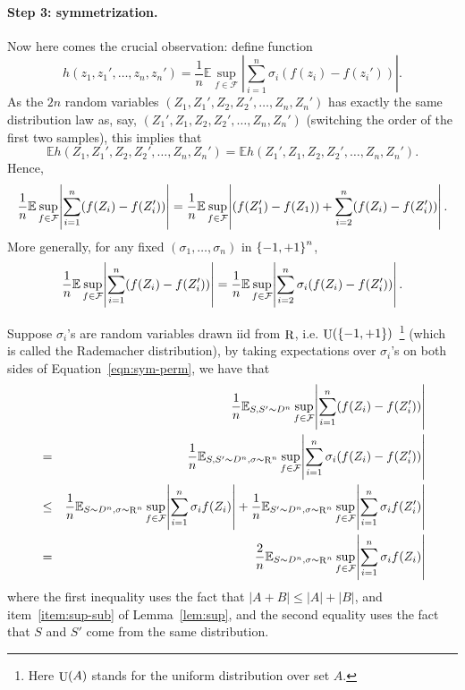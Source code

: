 \documentclass{article}
\DeclareMathOperator*{\R}{{\rm R}}
\DeclareMathOperator*{\U}{{\rm U}}
\newcommand{\EE}{\mathbb{E}}
\newcommand{\Fcal}{\mathcal{F}}
\begin{document}
\paragraph{Step 3: symmetrization.} Now here comes the crucial observation: define function
\[ h(z_1, z_1',\ldots,z_n,z_n') = \frac{1}{n} \EE \sup_{f \in \Fcal} |\sum_{i=1}^n \sigma_i (f(z_i) - f(z_i'))|. \]
As the $2n$ random variables
$(Z_1,Z_1',Z_2,Z_2',\ldots,Z_n,Z_n')$ has exactly the same distribution law as, say, $(Z_1',Z_1,Z_2,Z_2',\ldots,Z_n,Z_n')$ (switching the order of the first two samples), this implies that
\[ \EE h(Z_1,Z_1',Z_2,Z_2',\ldots,Z_n,Z_n') = \EE h(Z_1',Z_1,Z_2,Z_2',\ldots,Z_n,Z_n'). \]
Hence,
\[
  \frac{1}{n} \EE \sup_{f \in \Fcal} \abs{\sum_{i=1}^n (f(Z_i) - f(Z_i'))}
   = \frac{1}{n} \EE \sup_{f \in \Fcal} \abs{(f(Z_1') - f(Z_1)) + \sum_{i=2}^n (f(Z_i) - f(Z_i'))}.
\]
More generally, for any fixed $(\sigma_1, \ldots, \sigma_n)$ in $\cbr{-1,+1}^n$,
\begin{equation}
  \frac{1}{n} \EE \sup_{f \in \Fcal} \abs{\sum_{i=1}^n (f(Z_i) - f(Z_i'))}
  = \frac{1}{n} \EE \sup_{f \in \Fcal} \abs{\sum_{i=2}^n \sigma_i (f(Z_i) - f(Z_i'))}.
  \label{eqn:sym-perm}
\end{equation}




Suppose $\sigma_i$'s are random variables drawn iid from $\R$, i.e. $\U(\cbr{-1,+1})$~\footnote{Here $\U(A)$ stands for the uniform distribution over set $A$.} (which is called the Rademacher distribution), by taking expectations over $\sigma_i$'s on both sides of Equation~\eqref{eqn:sym-perm}, we have that
\begin{eqnarray}
&& \frac{1}{n} \EE_{S, S' \sim D^n} \sup_{f \in \Fcal} \abs{\sum_{i=1}^n (f(Z_i) - f(Z_i'))} \nonumber \\
&=&
\frac{1}{n} \EE_{S, S' \sim D^n, \sigma \sim \R^n} \sup_{f \in \Fcal} \abs{\sum_{i=1}^n \sigma_i(f(Z_i) - f(Z_i'))} \nonumber \\
&\leq&
\frac{1}{n} \EE_{S \sim D^n, \sigma \sim \R^n} \sup_{f \in \Fcal} \abs{\sum_{i=1}^n \sigma_i f(Z_i)} + \frac{1}{n} \EE_{S' \sim D^n, \sigma \sim \R^n} \sup_{f \in \Fcal} \abs{\sum_{i=1}^n \sigma_i f(Z_i')} \nonumber \\
&=& \frac{2}{n} \EE_{S \sim D^n, \sigma \sim \R^n} \sup_{f \in \Fcal} \abs{\sum_{i=1}^n \sigma_i f(Z_i)} \label{eqn:sym}
\end{eqnarray}
where the first inequality uses the fact that $|A+B| \leq |A| + |B|$, and item~\ref{item:sup-sub} of Lemma~\ref{lem:sup}, and the second equality uses the fact that
$S$ and $S'$ come from the same distribution.
\end{document}
